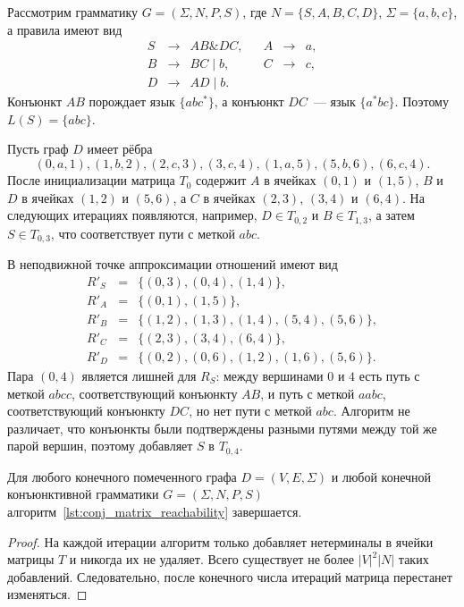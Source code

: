 \begin{example}
    Рассмотрим грамматику $G = (\Sigma,N,P,S)$, где $N = \{S,A,B,C,D\}$, $\Sigma = \{a,b,c\}$, а правила имеют вид
    \[
    \begin{array}{rclcrcl}
        S &\rightarrow& AB \& DC, && A &\rightarrow& a, \\
        B &\rightarrow& BC \mid b, && C &\rightarrow& c, \\
        D &\rightarrow& AD \mid b. &&&&
    \end{array}
    \]
    Конъюнкт $AB$ порождает язык $\{abc^*\}$, а конъюнкт $DC$~--- язык $\{a^*bc\}$. Поэтому $L(S)=\{abc\}$.

    Пусть граф $D$ имеет рёбра
    \[
        (0,a,1), (1,b,2), (2,c,3), (3,c,4), (1,a,5), (5,b,6), (6,c,4).
    \]
    После инициализации матрица $T_0$ содержит $A$ в ячейках $(0,1)$ и $(1,5)$, $B$ и $D$ в ячейках $(1,2)$ и $(5,6)$, а $C$ в ячейках $(2,3)$, $(3,4)$ и $(6,4)$. На следующих итерациях появляются, например, $D \in T_{0,2}$ и $B \in T_{1,3}$, а затем $S \in T_{0,3}$, что соответствует пути с меткой $abc$.

    В неподвижной точке аппроксимации отношений имеют вид
    \[
    \begin{array}{rcl}
        R'_S &=& \{(0,3),(0,4),(1,4)\},\\
        R'_A &=& \{(0,1),(1,5)\},\\
        R'_B &=& \{(1,2),(1,3),(1,4),(5,4),(5,6)\},\\
        R'_C &=& \{(2,3),(3,4),(6,4)\},\\
        R'_D &=& \{(0,2),(0,6),(1,2),(1,6),(5,6)\}.
    \end{array}
    \]
    Пара $(0,4)$ является лишней для $R_S$: между вершинами $0$ и $4$ есть путь с меткой $abcc$, соответствующий конъюнкту $AB$, и путь с меткой $aabc$, соответствующий конъюнкту $DC$, но нет пути с меткой $abc$. Алгоритм не различает, что конъюнкты были подтверждены разными путями между той же парой вершин, поэтому добавляет $S$ в $T_{0,4}$.
\end{example}

\begin{theorem}[Завершаемость]
    Для любого конечного помеченного графа $D = (V,E,\Sigma)$ и любой конечной конъюнктивной грамматики $G = (\Sigma,N,P,S)$ алгоритм~\ref{lst:conj_matrix_reachability} завершается.
\end{theorem}

\begin{proof}
    На каждой итерации алгоритм только добавляет нетерминалы в ячейки матрицы $T$ и никогда их не удаляет. Всего существует не более $|V|^2|N|$ таких добавлений. Следовательно, после конечного числа итераций матрица перестанет изменяться.
\end{proof}

